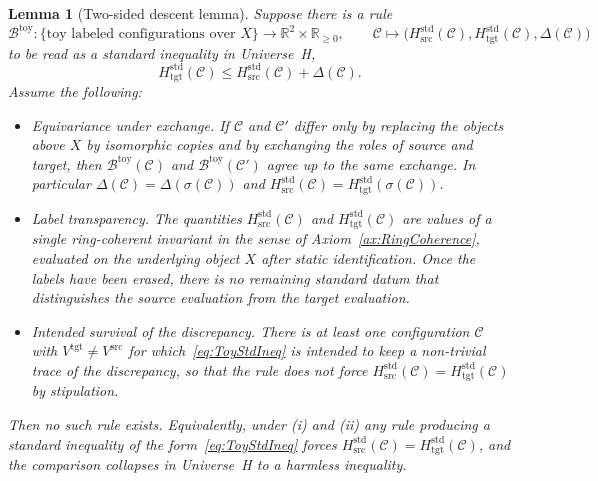 \documentclass[10pt, reqno]{amsart}
\theoremstyle{plain}
\newtheorem{lemma}[theorem]{Lemma}
\theoremstyle{definition}
\theoremstyle{plain}
\newcommand{\R}{\mathbb{R}}
\begin{document}
\begin{lemma}[Two-sided descent lemma]\label{lemma:ToyNoBridge}
Suppose there is a rule
\[
  \mathcal{B}^{\mathrm{toy}}
  \colon
  \{\text{toy labeled configurations over } X\}
  \longrightarrow
  \R^2 \times \R_{\ge 0},
  \qquad
  \mathcal{C} \longmapsto
  \bigl(H^{\mathrm{std}}_{\mathrm{src}}(\mathcal{C}), H^{\mathrm{std}}_{\mathrm{tgt}}(\mathcal{C}), \Delta(\mathcal{C})\bigr)
\]
to be read as a standard inequality in Universe~H,
\begin{equation}\label{eq:ToyStdIneq}
  H^{\mathrm{std}}_{\mathrm{tgt}}(\mathcal{C})
  \le
  H^{\mathrm{std}}_{\mathrm{src}}(\mathcal{C}) + \Delta(\mathcal{C}).
\end{equation}
Assume the following:
\begin{itemize}
\item[(i)] \emph{Equivariance under exchange.} If $\mathcal{C}$ and $\mathcal{C}'$ differ only by replacing the objects above $X$ by isomorphic copies and by exchanging the roles of source and target, then $\mathcal{B}^{\mathrm{toy}}(\mathcal{C})$ and $\mathcal{B}^{\mathrm{toy}}(\mathcal{C}')$ agree up to the same exchange. In particular $\Delta(\mathcal{C}) = \Delta(\sigma(\mathcal{C}))$ and $H^{\mathrm{std}}_{\mathrm{src}}(\mathcal{C}) = H^{\mathrm{std}}_{\mathrm{tgt}}(\sigma(\mathcal{C}))$.

\item[(ii)] \emph{Label transparency.} The quantities $H^{\mathrm{std}}_{\mathrm{src}}(\mathcal{C})$ and $H^{\mathrm{std}}_{\mathrm{tgt}}(\mathcal{C})$ are values of a single ring-coherent invariant in the sense of Axiom~\ref{ax:RingCoherence}, evaluated on the underlying object $X$ after static identification. Once the labels have been erased, there is no remaining standard datum that distinguishes the source evaluation from the target evaluation.

\item[(iii)] \emph{Intended survival of the discrepancy.} There is at least one configuration $\mathcal{C}$ with $V^{\mathrm{tgt}} \ne V^{\mathrm{src}}$ for which~\eqref{eq:ToyStdIneq} is intended to keep a non-trivial trace of the discrepancy, so that the rule does not force $H^{\mathrm{std}}_{\mathrm{src}}(\mathcal{C}) = H^{\mathrm{std}}_{\mathrm{tgt}}(\mathcal{C})$ by stipulation.
\end{itemize}
Then no such rule exists. Equivalently, under (i) and (ii) any rule producing a standard inequality of the form~\eqref{eq:ToyStdIneq} forces $H^{\mathrm{std}}_{\mathrm{src}}(\mathcal{C}) = H^{\mathrm{std}}_{\mathrm{tgt}}(\mathcal{C})$, and the comparison collapses in Universe~H to a harmless inequality.
\end{lemma}
\end{document}
